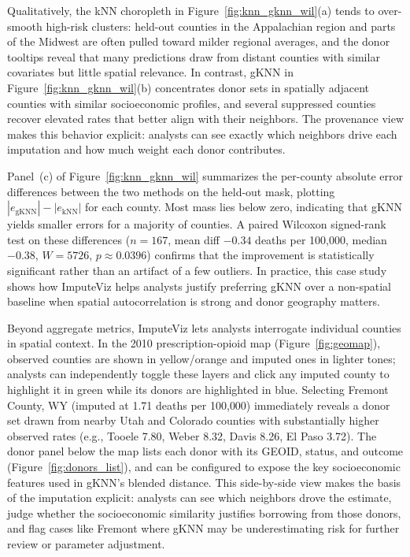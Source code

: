 \documentclass[review]{vgtc}
\begin{document}
Qualitatively, the kNN choropleth in Figure~\ref{fig:knn_gknn_wil}(a) tends to over-smooth high-risk clusters: held-out counties in the Appalachian region and parts of the Midwest are often pulled toward milder regional averages, and the donor tooltips reveal that many predictions draw from distant counties with similar covariates but little spatial relevance. In contrast, gKNN in Figure~\ref{fig:knn_gknn_wil}(b) concentrates donor sets in spatially adjacent counties with similar socioeconomic profiles, and several suppressed counties recover elevated rates that better align with their neighbors. The provenance view makes this behavior explicit: analysts can see exactly which neighbors drive each imputation and how much weight each donor contributes.

Panel~(c) of Figure~\ref{fig:knn_gknn_wil} summarizes the per-county absolute error differences between the two methods on the held-out mask, plotting $|e_\text{gKNN}| - |e_\text{kNN}|$ for each county. Most mass lies below zero, indicating that gKNN yields smaller errors for a majority of counties. A paired Wilcoxon signed-rank test on these differences ($n = 167$, mean diff $-0.34$ deaths per 100{,}000, median $-0.38$, $W = 5726$, $p \approx 0.0396$) confirms that the improvement is statistically significant rather than an artifact of a few outliers. In practice, this case study shows how ImputeViz helps analysts justify preferring gKNN over a non-spatial baseline when spatial autocorrelation is strong and donor geography matters.

Beyond aggregate metrics, ImputeViz lets analysts interrogate individual counties in spatial context. In the 2010 prescription-opioid map (Figure~\ref{fig:geomap}), observed counties are shown in yellow/orange and imputed ones in lighter tones; analysts can independently toggle these layers and click any imputed county to highlight it in green while its donors are highlighted in blue. Selecting Fremont County, WY (imputed at 1.71 deaths per 100{,}000) immediately reveals a donor set drawn from nearby Utah and Colorado counties with substantially higher observed rates (e.g., Tooele 7.80, Weber 8.32, Davis 8.26, El Paso 3.72). The donor panel below the map lists each donor with its GEOID, status, and outcome (Figure~\ref{fig:donors_list}), and can be configured to expose the key socioeconomic features used in gKNN's blended distance. This side-by-side view makes the basis of the imputation explicit: analysts can see which neighbors drove the estimate, judge whether the socioeconomic similarity justifies borrowing from those donors, and flag cases like Fremont where gKNN may be underestimating risk for further review or parameter adjustment.
\end{document}
